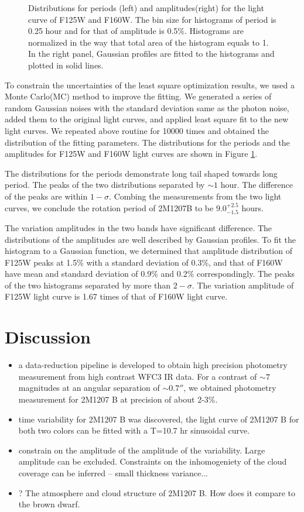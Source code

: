 \documentclass[apj]{emulateapj}
\begin{document}
\begin{figure}
  \centering
  \caption{Distributions for periods (left) and amplitudes(right) for the light
    curve of F125W and F160W. The bin size for histograms of period is
  0.25 hour and for that of amplitude is 0.5\%. Histograms are
  normalized in the way that total area of the histogram equals to
  1. In the right panel, Gaussian profiles are fitted to the
  histograms and plotted in solid lines.}
  \label{fig:4}
\end{figure}

To constrain the uncertainties of the least square optimization
results, we used a Monte Carlo(MC) method to improve the fitting. We
generated a series of random Gaussian noises with the standard deviation same as
the photon noise, added them to the original light curves, and applied
least square fit to the new light curves. We repeated above routine for 10000 times and obtained
the distribution of the fitting parameters. The distributions for the
periods and the amplitudes for F125W and F160W light curves are
shown in Figure \ref{fig:4}.

The distributions for the periods demonstrate long tail shaped towards
long period. The peaks of the two distributions separated by $\sim 1$
hour. The difference of the peaks are within $1-\sigma$. Combing the
measurements from the two light curves, we conclude the rotation period
of 2M1207B to be $9.0_{-1.5}^{+2.5}$ hours.

The variation amplitudes in the two bands have significant
difference. The distributions of the amplitudes are well described by
Gaussian profiles. To fit the histogram to a Gaussian function, we
determined that amplitude distribution of F125W peaks at 1.5\% with a
standard deviation of 0.3\%, and that of F160W have mean and standard
deviation of 0.9\% and 0.2\% correspondingly. The peaks of the two
histograms separated by more than $2-\sigma$. The variation amplitude
of F125W light curve is 1.67 times of that of F160W light curve.

\section{Discussion}
\begin{itemize}
\item a data-reduction pipeline is developed to obtain high precision
  photometry measurement from high contrast WFC3 IR data. For a
  contrast of $\sim 7$ magnitudes at an angular separation of
  $\sim0.7''$, we obtained photometry measurement for 2M1207 B at
  precision of about 2-3\%. 
\item time variability for 2M1207 B was discovered, the light curve of
  2M1207 B for both two colors can be fitted with a T=10.7 hr
  sinusoidal curve.
\item constrain on the amplitude of the amplitude of the
  variability. Large amplitude can be excluded. Constraints on the
  inhomogeniety of the cloud coverage can be inferred -- small
  thickness variance...
\item ? The atmosphere and cloud structure of 2M1207 B. How does it
  compare to the brown dwarf.
\end{itemize}

\end{document}
